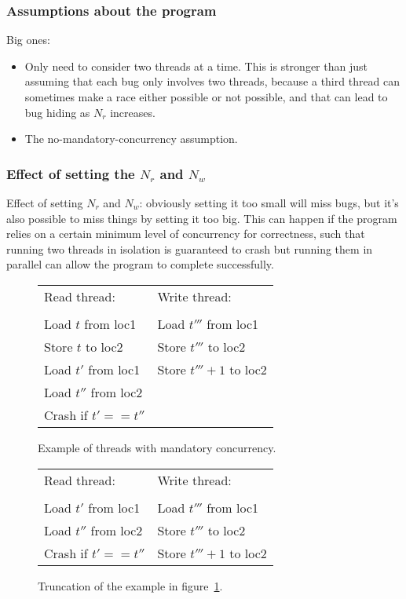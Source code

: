 \subsubsection{Assumptions about the program}

Big ones:

\begin{itemize}
\item
  Only need to consider two threads at a time.
  This is stronger than just assuming that each bug only involves two threads, because a third thread can sometimes make a race either possible or not possible, and that can lead to bug hiding as $N_r$ increases.
\item
  The no-mandatory-concurrency assumption.
\end{itemize}

\subsubsection{Effect of setting the $N_r$ and $N_w$}

Effect of setting $N_r$ and $N_w$: obviously setting it too small will miss bugs, but it's also possible to miss things by setting it too big.
This can happen if the program relies on a certain minimum level of concurrency for correctness, such that running two threads in isolation is guaranteed to crash but running them in parallel can allow the program to complete successfully.

\begin{figure}
\begin{tabular}{ll}
Read thread:         & Write thread: \\
\\
Load $t$ from loc1   & Load $t'''$ from loc1 \\
Store $t$ to loc2    & Store $t'''$ to loc2 \\
Load $t'$ from loc1  & Store $t''' + 1$ to loc2 \\
Load $t''$ from loc2 & \\
Crash if $t' == t''$ & \\
\end{tabular}
\label{fig:mandatory_concurrency1}
\caption{Example of threads with mandatory concurrency.}
\end{figure}

\begin{figure}
\begin{tabular}{ll}
Read thread:          & Write thread: \\
\\
Load $t'$ from loc1   & Load $t'''$ from loc1 \\
Load $t''$ from loc2  & Store $t'''$ to loc2 \\
Crash if $t' == t''$  & Store $t''' + 1$ to loc2
\end{tabular}
\label{fig:mandatory_concurrency2}
\caption{Truncation of the example in figure~\ref{fig:mandatory_concurrency1}.}
\end{figure}

